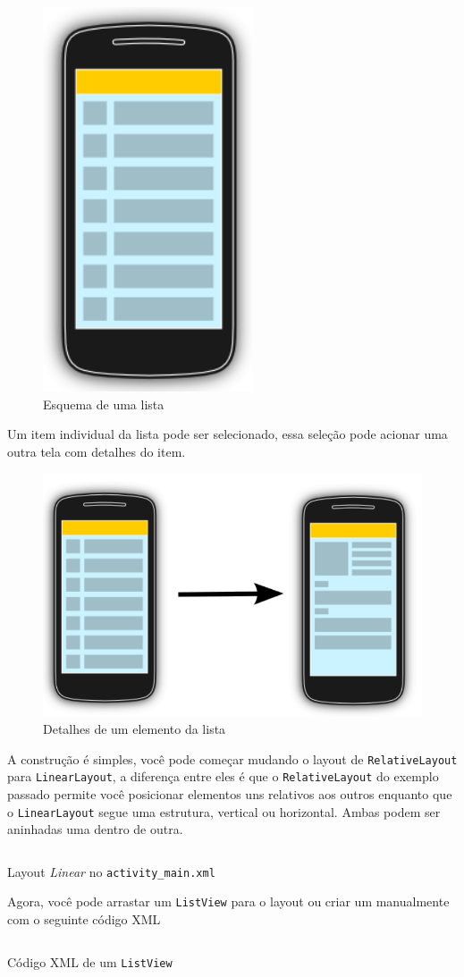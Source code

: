 \documentclass[a4paper,12pt,brazil,doubleside]{book}
\begin{document}
\begin{singlespace}
\begin{figure}[H]
  \centering
  \includegraphics[width=.15\textwidth]{figuras/design/listview-scheme.png}
  \caption{Esquema de uma lista}
  \label{fig:e}
\end{figure}

Um item individual da lista pode ser selecionado, essa seleção pode acionar uma outra tela com detalhes do item.


\begin{figure}[H]
  \centering
  \includegraphics[width=.35\textwidth]{figuras/design/listview-scheme2.png}
  \caption{Detalhes de um elemento da lista}
  \label{fig:e}
\end{figure}

\newpage

A construção é simples, você pode começar mudando o layout de \texttt{RelativeLayout} para \texttt{LinearLayout}, a diferença entre eles é que o \texttt{RelativeLayout} do exemplo passado permite você posicionar elementos uns relativos aos outros enquanto que o \texttt{LinearLayout} segue uma estrutura, vertical ou horizontal. Ambas podem ser aninhadas uma dentro de outra.

\begin{listing}[H]
\inputminted[linenos=true,fontsize=\small,frame=lines, framesep=2mm, tabsize=2,numbersep=5pt]{xml}{src/design/layout_linear.xml}
\caption{Layout \textit{Linear} no \texttt{activity\_main.xml}}
\end{listing}

Agora, você pode arrastar um \texttt{ListView} para o layout ou criar um manualmente com o seguinte código XML

\begin{listing}[H]
\inputminted[linenos=true,fontsize=\small,frame=lines, framesep=2mm, tabsize=2,numbersep=5pt]{xml}{src/design/listview.xml}
\caption{Código XML de um \texttt{ListView}}
\end{listing}


\end{singlespace}
\end{document}
